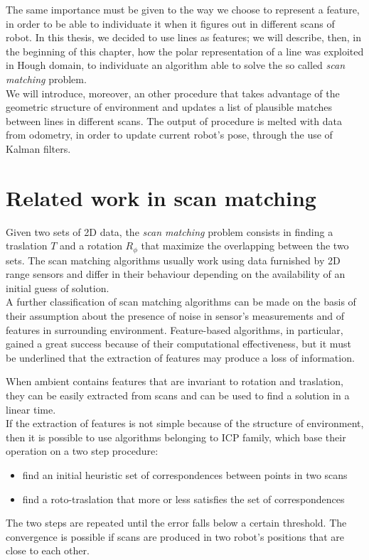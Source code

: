 \documentclass[a4paper, onecolumn]{report}
\begin{document}
The same importance must be given to the way we choose to represent a feature, in order to be able to individuate it when it figures out in different scans of robot. In this thesis, we decided to use lines as features; we will describe, then, in the beginning of this chapter, how the polar representation of a line was exploited in Hough domain, to individuate an algorithm able to solve the so called \emph{scan matching} problem. \\ 
We will introduce, moreover, an other procedure that takes advantage of the geometric structure of environment and updates a list of plausible matches between lines in different scans. The output of procedure is melted with data from odometry, in order to update current robot's pose, through the use of Kalman filters.

\section{Related work in scan matching}
Given two sets of 2D data, the \emph{scan matching} problem consists in finding a traslation $T$ and a rotation $R_\phi$ that maximize the overlapping between the two sets. The scan matching algorithms usually work using data furnished by 2D range sensors and differ in their behaviour depending on the availability of an initial guess of solution. \\
A further classification of scan matching algorithms can be made on the basis of their assumption about the presence of noise in sensor's measurements and of features in surrounding environment. Feature-based algorithms, in particular, gained a great success because of their computational effectiveness, but it must be underlined that the extraction of features may produce a loss of information. 

When ambient contains features that are invariant to rotation and traslation, they can be easily extracted from scans and can be used to find a solution in a linear time. \\
If the extraction of features is not simple because of the structure of environment, then it is possible to use algorithms belonging to ICP family, which base their operation on a two step procedure:
\begin{itemize}
	\item{find an initial heuristic set of correspondences between points in two scans}
	\item{find a roto-traslation that more or less satisfies the set of correspondences}
\end{itemize}
The two steps are repeated until the error falls below a certain threshold. The convergence is possible if scans are produced in two robot's positions that are close to each other.
\end{document}

